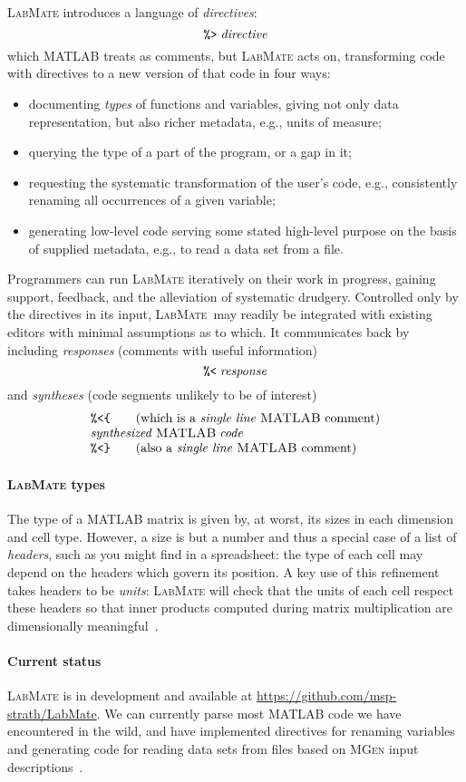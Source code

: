 \documentclass{ws-procs9x6}
\newcommand{\pct}{\texttt{\symbol{37}}}
\newcommand{\dir}{\texttt{\symbol{62}}}
\newcommand{\res}{\texttt{\symbol{60}}}
\newcommand{\lcb}{\texttt{\symbol{123}}}
\newcommand{\rcb}{\texttt{\symbol{125}}}
\newcommand{\lr}{\textsc{LabMate}}
\newcommand{\repo}{\url{https://github.com/msp-strath/LabMate}}
\newcommand{\ma}{\textsc{MATLAB}}
\newcommand{\remph}{\emph}
\begin{document}
\lr{} introduces a language of \emph{directives}:
\[\pct\dir\;\mathit{directive}
\]
which \ma{} treats as comments, but \lr{} acts on, transforming code with directives to a new version of that code in four ways:
\begin{itemize}
\item documenting \remph{types} of functions and variables, giving not only data representation, but also richer metadata, e.g., units of measure;
\item querying the type of a part of the program, or a gap in it;
\item requesting the systematic transformation of the user's code, e.g., consistently renaming all occurrences of a given variable;
\item generating low-level code serving some stated high-level purpose on the basis of supplied metadata, e.g., to read a data set from a file.
\end{itemize}
Programmers can run \lr{} iteratively on their work in progress, gaining support, feedback, and the alleviation of systematic drudgery. Controlled only by the directives in its input, \lr\ may readily be integrated with existing editors with minimal assumptions as to which. It communicates back by including \emph{responses} (comments with useful information)
\[
\pct\res\;\mathit{response}
\]
and \emph{syntheses} (code segments unlikely to be of interest)
\[\begin{array}{l}
\pct\res\lcb\qquad \mbox{(which is a \remph{single line} \ma{} comment)}\\
\mathit{synthesized}\; \ma\;\mathit{code}\\
\pct\res\rcb\qquad \mbox{(also a \remph{single line} \ma{} comment)} \\
\end{array}\]

\paragraph{\lr{} types}

The type of a \ma{} matrix is given by, at worst, its sizes in each dimension and cell type. However, a size is but a number and thus a special case of a list of \remph{headers}, such as you might find in a spreadsheet: the type of each cell may depend on the headers which govern its position. A key use of this refinement takes headers to be \remph{units}: \lr{} will check that the units of each cell respect these headers so that inner products computed during matrix multiplication are dimensionally meaningful~\cite{dimTypes}.

\paragraph{Current status}

\lr{} is in development and available at \repo. We can currently parse most \ma{} code we have encountered in the wild, and have implemented directives for renaming variables and generating code for reading data sets from files based on \textsc{MGen} input descriptions~\cite{mgen}.



\end{document}
